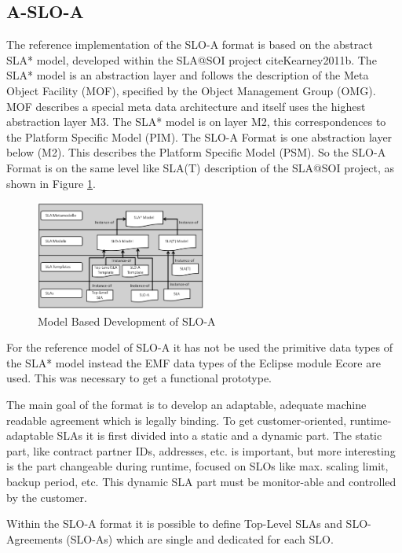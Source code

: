 \subsection{A-SLO-A}
The reference implementation of the SLO-A format is based on the abstract SLA* model, developed within the SLA@SOI project cite{Kearney2011b}. The SLA* model is an abstraction layer and follows the description of the Meta Object Facility (MOF), specified by the Object Management Group (OMG). MOF describes a special meta data architecture and itself uses the highest abstraction layer M3. The SLA* model is on layer M2, this correspondences to the Platform Specific Model (PIM). The SLO-A Format is one abstraction layer below (M2). This describes the Platform Specific Model (PSM). So the SLO-A Format is on the same level like SLA(T) description of the SLA@SOI project, as shown in Figure \ref{fig:mbd_SLOA}.
\begin{figure}[ht]
\includegraphics[width=0.5\textwidth]{fig/Modellbasierte_Entwicklung_Instanz.png}
\caption{Model Based Development of SLO-A}
\label{fig:mbd_SLOA}
\end{figure}
For the reference model of SLO-A it has not be used the primitive data types of the SLA* model instead the EMF data types of the Eclipse module Ecore are used. This was necessary to get a functional prototype.

The main goal of the format is to develop an adaptable, adequate machine readable agreement which is legally binding. To get customer-oriented, runtime-adaptable SLAs it is first divided into a static and a dynamic part. The static part, like contract partner IDs, addresses, etc. is important, but more interesting is the part changeable during runtime, focused on SLOs like max. scaling limit, backup period, etc. This dynamic SLA part must be monitor-able and controlled by the customer.

Within the SLO-A format it is possible to define Top-Level SLAs and SLO-Agreements (SLO-As) which are single and dedicated for each SLO.


